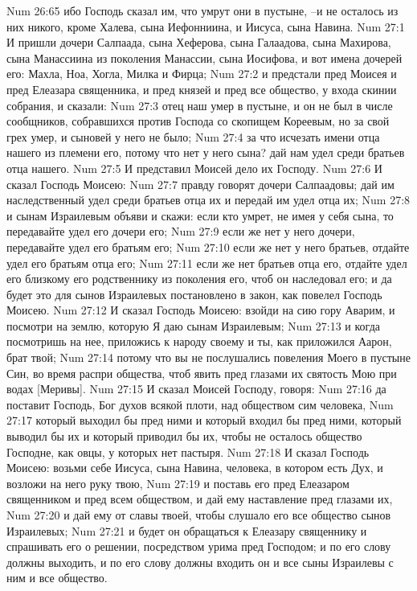 Num 26:65  ибо Господь сказал им, что умрут они в пустыне, --и не осталось из них никого, кроме Халева, сына Иефонниина, и Иисуса, сына Навина.
Num 27:1  И пришли дочери Салпаада, сына Хеферова, сына Галаадова, сына Махирова, сына Манассиина из поколения Манассии, сына Иосифова, и вот имена дочерей его: Махла, Ноа, Хогла, Милка и Фирца;
Num 27:2  и предстали пред Моисея и пред Елеазара священника, и пред князей и пред все общество, у входа скинии собрания, и сказали:
Num 27:3  отец наш умер в пустыне, и он не был в числе сообщников, собравшихся против Господа со скопищем Кореевым, но за свой грех умер, и сыновей у него не было;
Num 27:4  за что исчезать имени отца нашего из племени его, потому что нет у него сына? дай нам удел среди братьев отца нашего.
Num 27:5  И представил Моисей дело их Господу.
Num 27:6  И сказал Господь Моисею:
Num 27:7  правду говорят дочери Салпаадовы; дай им наследственный удел среди братьев отца их и передай им удел отца их;
Num 27:8  и сынам Израилевым объяви и скажи: если кто умрет, не имея у себя сына, то передавайте удел его дочери его;
Num 27:9  если же нет у него дочери, передавайте удел его братьям его;
Num 27:10  если же нет у него братьев, отдайте удел его братьям отца его;
Num 27:11  если же нет братьев отца его, отдайте удел его близкому его родственнику из поколения его, чтоб он наследовал его; и да будет это для сынов Израилевых постановлено в закон, как повелел Господь Моисею.
Num 27:12  И сказал Господь Моисею: взойди на сию гору Аварим, и посмотри на землю, которую Я даю сынам Израилевым;
Num 27:13  и когда посмотришь на нее, приложись к народу своему и ты, как приложился Аарон, брат твой;
Num 27:14  потому что вы не послушались повеления Моего в пустыне Син, во время распри общества, чтоб явить пред глазами их святость Мою при водах [Меривы].
Num 27:15  И сказал Моисей Господу, говоря:
Num 27:16  да поставит Господь, Бог духов всякой плоти, над обществом сим человека,
Num 27:17  который выходил бы пред ними и который входил бы пред ними, который выводил бы их и который приводил бы их, чтобы не осталось общество Господне, как овцы, у которых нет пастыря.
Num 27:18  И сказал Господь Моисею: возьми себе Иисуса, сына Навина, человека, в котором есть Дух, и возложи на него руку твою,
Num 27:19  и поставь его пред Елеазаром священником и пред всем обществом, и дай ему наставление пред глазами их,
Num 27:20  и дай ему от славы твоей, чтобы слушало его все общество сынов Израилевых;
Num 27:21  и будет он обращаться к Елеазару священнику и спрашивать его о решении, посредством урима пред Господом; и по его слову должны выходить, и по его слову должны входить он и все сыны Израилевы с ним и все общество.
